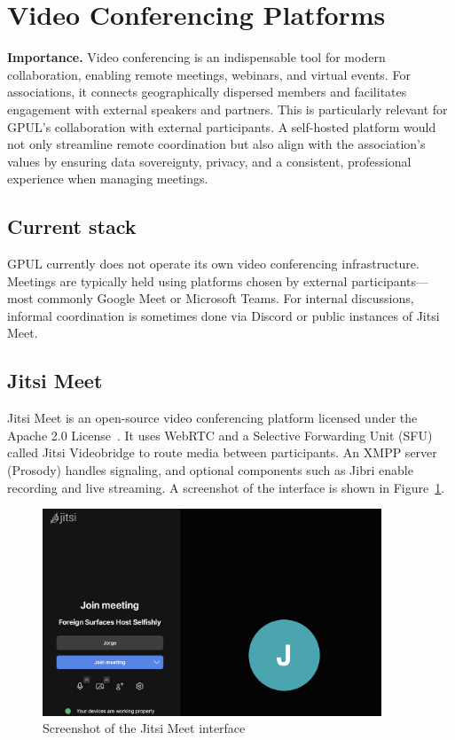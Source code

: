 \section{Video Conferencing Platforms}

\textbf{Importance.} Video conferencing is an indispensable tool for modern collaboration, enabling remote meetings, webinars, and virtual events. For associations, it connects geographically dispersed members and facilitates engagement with external speakers and partners. This is particularly relevant for GPUL's collaboration with external participants. A self-hosted platform would not only streamline remote coordination but also align with the association's values by ensuring data sovereignty, privacy, and a consistent, professional experience when managing meetings.

\subsection*{Current stack}

GPUL currently does not operate its own video conferencing infrastructure. Meetings are typically held using platforms chosen by external participants—most commonly Google Meet or Microsoft Teams. For internal discussions, informal coordination is sometimes done via Discord or public instances of Jitsi Meet.

\subsection*{Jitsi Meet}

Jitsi Meet is an open-source video conferencing platform licensed under the Apache 2.0 License~\cite{jitsi-docs}. It uses WebRTC and a Selective Forwarding Unit (SFU) called Jitsi Videobridge to route media between participants. An XMPP server (Prosody) handles signaling, and optional components such as Jibri enable recording and live streaming. A screenshot of the interface is shown in Figure~\ref{fig:jitsi-ui}.

\begin{figure}[H]
  \centering
  \includegraphics[width=0.9\textwidth]{imaxes/jitsi-ui.png}
  \caption{Screenshot of the Jitsi Meet interface}
  \label{fig:jitsi-ui}
\end{figure}

